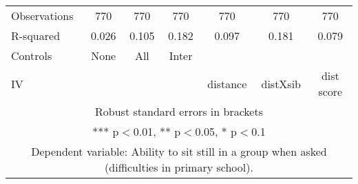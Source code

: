 \begin{tabular}{lcccccc}
Observations & 770 & 770 & 770 & 770 & 770 & 770 \\
R-squared & 0.026 & 0.105 & 0.182 & 0.097 & 0.181 & 0.079 \\
Controls & None & All & Inter &  &  &  \\
 IV &  &  &  & distance & distXsib & dist score \\ \hline
\multicolumn{7}{c}{ Robust standard errors in brackets} \\
\multicolumn{7}{c}{ *** p$<$0.01, ** p$<$0.05, * p$<$0.1} \\
\multicolumn{7}{c}{ Dependent variable: Ability to sit still in a group when asked (difficulties in primary school).} \\
\end{tabular}
